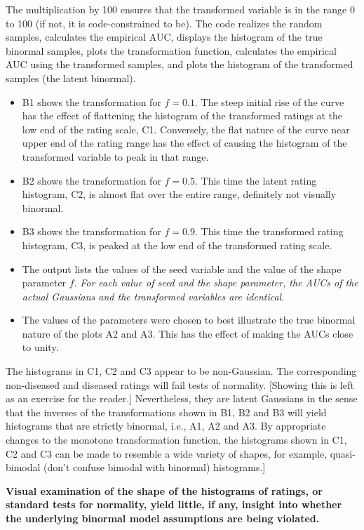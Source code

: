 \documentclass[
]{book}
\providecommand{\tightlist}{%
  \setlength{\itemsep}{0pt}\setlength{\parskip}{0pt}}
\begin{document}
The multiplication by 100 ensures that the transformed variable is in the range 0 to 100 (if not, it is code-constrained to be). The code realizes the random samples, calculates the empirical AUC, displays the histogram of the true binormal samples, plots the transformation function, calculates the empirical AUC using the transformed samples, and plots the histogram of the transformed samples (the latent binormal).

\begin{itemize}
\tightlist
\item
  B1 shows the transformation for \(f = 0.1\). The steep initial rise of the curve has the effect of flattening the histogram of the transformed ratings at the low end of the rating scale, C1. Conversely, the flat nature of the curve near upper end of the rating range has the effect of causing the histogram of the transformed variable to peak in that range.
\item
  B2 shows the transformation for \(f = 0.5\). This time the latent rating histogram, C2, is almost flat over the entire range, definitely not visually binormal.
\item
  B3 shows the transformation for \(f = 0.9\). This time the transformed rating histogram, C3, is peaked at the low end of the transformed rating scale.
\item
  The output lists the values of the seed variable and the value of the shape parameter \(f\). \emph{For each value of seed and the shape parameter, the AUCs of the actual Gaussians and the transformed variables are identical}.
\item
  The values of the parameters were chosen to best illustrate the true binormal nature of the plots A2 and A3. This has the effect of making the AUCs close to unity.
\end{itemize}

The histograms in C1, C2 and C3 appear to be non-Gaussian. The corresponding non-diseased and diseased ratings will fail tests of normality. {[}Showing this is left as an exercise for the reader.{]} Nevertheless, they are latent Gaussians in the sense that the inverses of the transformations shown in B1, B2 and B3 will yield histograms that are strictly binormal, i.e., A1, A2 and A3. By appropriate changes to the monotone transformation function, the histograms shown in C1, C2 and C3 can be made to resemble a wide variety of shapes, for example, quasi-bimodal (don't confuse bimodal with binormal) histograms.{]}

\textbf{Visual examination of the shape of the histograms of ratings, or standard tests for normality, yield little, if any, insight into whether the underlying binormal model assumptions are being violated.}
\end{document}
